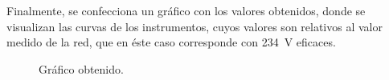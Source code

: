 Finalmente, se confecciona un gráfico con los valores obtenidos, 
donde se visualizan las curvas de los instrumentos, cuyos valores 
son relativos al valor medido de la red, que en éste caso corresponde 
con 234~V eficaces.

\begin{figure}[H]
  \centering
  \caption{Gráfico obtenido.}
  \label{fig:CurvaTrueMedio}
\end{figure}
